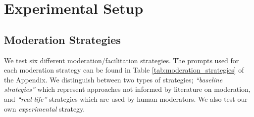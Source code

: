 \section{Experimental Setup}

\subsection{Moderation Strategies}
\label{ssec:setup:strategies}

We test six different moderation/facilitation strategies. The prompts used for each moderation strategy can be found in Table \ref{tab:moderation_strategies} of the Appendix. We distinguish between two types of strategies; \emph{“baseline strategies”} which represent approaches not informed by literature on moderation, and \emph{“real-life”} strategies which are used by human moderators. We also test our own \emph{experimental} strategy.

